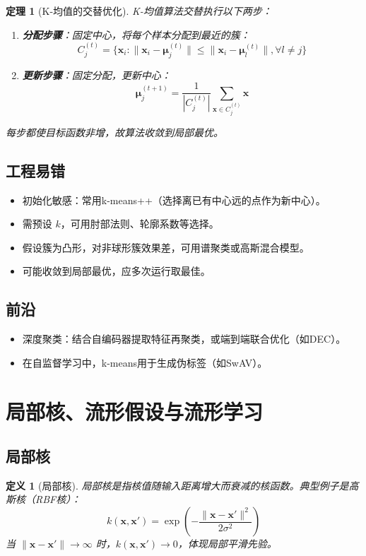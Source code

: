 \documentclass[UTF8, 10pt]{ctexart}
\newtheorem{theorem}{定理}[section]
\newtheorem{definition}{定义}[section]
\begin{document}
\begin{theorem}[K-均值的交替优化]
K-均值算法交替执行以下两步：
\begin{enumerate}
    \item \textbf{分配步骤}：固定中心，将每个样本分配到最近的簇：
    \[
    C_j^{(t)} = \{\bm{x}_i : \|\bm{x}_i - \bm{\mu}_j^{(t)}\| \le \|\bm{x}_i - \bm{\mu}_l^{(t)}\|, \forall l \neq j\}
    \]
    \item \textbf{更新步骤}：固定分配，更新中心：
    \[
    \bm{\mu}_j^{(t+1)} = \frac{1}{|C_j^{(t)}|} \sum_{\bm{x} \in C_j^{(t)}} \bm{x}
    \]
\end{enumerate}
每步都使目标函数非增，故算法收敛到局部最优。
\end{theorem}

\subsection{工程易错}
\begin{itemize}
    \item 初始化敏感：常用k-means++（选择离已有中心远的点作为新中心）。
    \item 需预设 $k$，可用肘部法则、轮廓系数等选择。
    \item 假设簇为凸形，对非球形簇效果差，可用谱聚类或高斯混合模型。
    \item 可能收敛到局部最优，应多次运行取最佳。
\end{itemize}

\subsection{前沿}
\begin{itemize}
    \item 深度聚类：结合自编码器提取特征再聚类，或端到端联合优化（如DEC）。
    \item 在自监督学习中，k-means用于生成伪标签（如SwAV）。
\end{itemize}

\section{局部核、流形假设与流形学习}
\subsection{局部核}
\begin{definition}[局部核]
局部核是指核值随输入距离增大而衰减的核函数。典型例子是高斯核（RBF核）：
\[
k(\bm{x}, \bm{x}') = \exp\left(-\frac{\|\bm{x} - \bm{x}'\|^2}{2\sigma^2}\right)
\]
当 $\|\bm{x} - \bm{x}'\| \to \infty$ 时，$k(\bm{x}, \bm{x}') \to 0$，体现局部平滑先验。
\end{definition}
\end{document}
